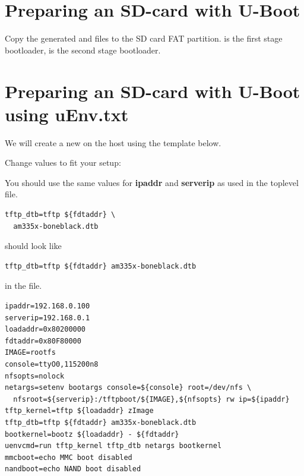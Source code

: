 \section{Preparing an SD-card with U-Boot}

Copy the generated  and  files
to the SD card FAT partition.  is the first stage bootloader,
 is the second stage bootloader.

\clearpage

\section{Preparing an SD-card with U-Boot using uEnv.txt}

We will create a new  on the host using the template below.

Change values to fit your setup:

You should use the same values for {\bf ipaddr} and {\bf serverip} as used in the toplevel  file.


\begin{verbatim}
tftp_dtb=tftp ${fdtaddr} \
  am335x-boneblack.dtb
\end{verbatim}

should look like

\begin{verbatim}
tftp_dtb=tftp ${fdtaddr} am335x-boneblack.dtb
\end{verbatim}

in the file.



\begin{verbatim}
ipaddr=192.168.0.100
serverip=192.168.0.1
loadaddr=0x80200000
fdtaddr=0x80F80000
IMAGE=rootfs
console=ttyO0,115200n8
nfsopts=nolock
netargs=setenv bootargs console=${console} root=/dev/nfs \
  nfsroot=${serverip}:/tftpboot/${IMAGE},${nfsopts} rw ip=${ipaddr}
tftp_kernel=tftp ${loadaddr} zImage
tftp_dtb=tftp ${fdtaddr} am335x-boneblack.dtb
bootkernel=bootz ${loadaddr} - ${fdtaddr}
uenvcmd=run tftp_kernel tftp_dtb netargs bootkernel
mmcboot=echo MMC boot disabled
nandboot=echo NAND boot disabled
\end{verbatim}

